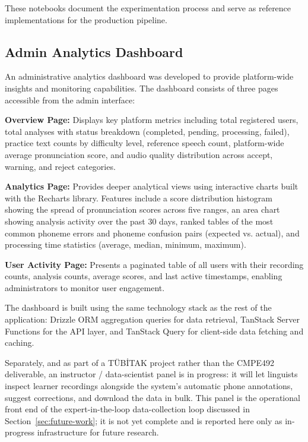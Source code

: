 \documentclass[a4paper,12pt]{report}
\begin{document}
These notebooks document the experimentation process and serve as reference implementations for the production pipeline.

\subsection{Admin Analytics Dashboard}

An administrative analytics dashboard was developed to provide platform-wide insights and monitoring capabilities. The dashboard consists of three pages accessible from the admin interface:

\textbf{Overview Page:} Displays key platform metrics including total registered users, total analyses with status breakdown (completed, pending, processing, failed), practice text counts by difficulty level, reference speech count, platform-wide average pronunciation score, and audio quality distribution across accept, warning, and reject categories.

\textbf{Analytics Page:} Provides deeper analytical views using interactive charts built with the Recharts library. Features include a score distribution histogram showing the spread of pronunciation scores across five ranges, an area chart showing analysis activity over the past 30 days, ranked tables of the most common phoneme errors and phoneme confusion pairs (expected vs. actual), and processing time statistics (average, median, minimum, maximum).

\textbf{User Activity Page:} Presents a paginated table of all users with their recording counts, analysis counts, average scores, and last active timestamps, enabling administrators to monitor user engagement.

The dashboard is built using the same technology stack as the rest of the application: Drizzle ORM aggregation queries for data retrieval, TanStack Server Functions for the API layer, and TanStack Query for client-side data fetching and caching.

Separately, and as part of a TÜBİTAK project rather than the CMPE492 deliverable, an instructor / data-scientist panel is in progress: it will let linguists inspect learner recordings alongside the system's automatic phone annotations, suggest corrections, and download the data in bulk. This panel is the operational front end of the expert-in-the-loop data-collection loop discussed in Section~\ref{sec:future-work}; it is not yet complete and is reported here only as in-progress infrastructure for future research.
\end{document}
